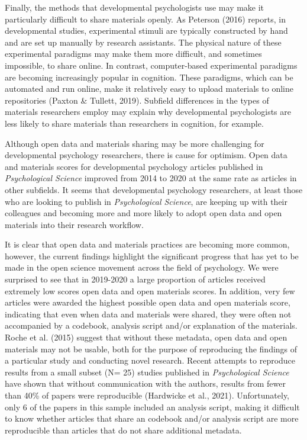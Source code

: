 \documentclass[
  english,
  man,floatsintext]{apa6}
\begin{document}
Finally, the methods that developmental psychologists use may make it particularly difficult to share materials openly. As Peterson (2016) reports, in developmental studies, experimental stimuli are typically constructed by hand and are set up manually by research assistants. The physical nature of these experimental paradigms may make them more difficult, and sometimes impossible, to share online. In contrast, computer-based experimental paradigms are becoming increasingly popular in cognition. These paradigms, which can be automated and run online, make it relatively easy to upload materials to online repositories (Paxton \& Tullett, 2019). Subfield differences in the types of materials researchers employ may explain why developmental psychologists are less likely to share materials than researchers in cognition, for example.

Although open data and materials sharing may be more challenging for developmental psychology researchers, there is cause for optimism. Open data and materials scores for developmental psychology articles published in \emph{Psychological Science} improved from 2014 to 2020 at the same rate as articles in other subfields. It seems that developmental psychology researchers, at least those who are looking to publish in \emph{Psychological Science}, are keeping up with their colleagues and becoming more and more likely to adopt open data and open materials into their research workflow.

It is clear that open data and materials practices are becoming more common, however, the current findings highlight the significant progress that has yet to be made in the open science movement across the field of psychology. We were surprised to see that in 2019-2020 a large proportion of articles received extremely low scores open data and open materials scores. In addition, very few articles were awarded the highest possible open data and open materials score, indicating that even when data and materials were shared, they were often not accompanied by a codebook, analysis script and/or explanation of the materials. Roche et al. (2015) suggest that without these metadata, open data and open materials may not be usable, both for the purpose of reproducing the findings of a particular study and conducting novel research. Recent attempts to reproduce results from a small subset (N= 25) studies published in \emph{Psychological Science} have shown that without communication with the authors, results from fewer than 40\% of papers were reproducible (Hardwicke et al., 2021). Unfortunately, only 6 of the papers in this sample included an analysis script, making it difficult to know whether articles that share an codebook and/or analysis script are more reproducible than articles that do not share additional metadata.
\end{document}
